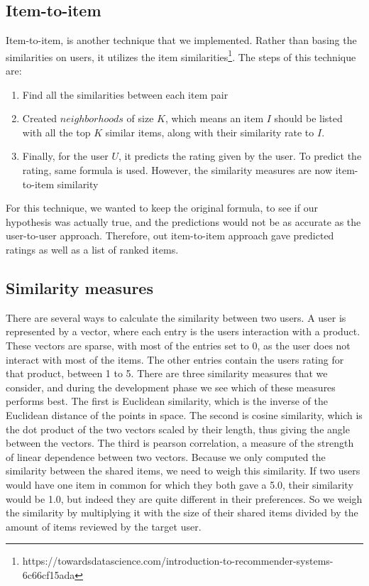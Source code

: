\documentclass[11pt]{article}
\begin{document}
\subsection{Item-to-item}
Item-to-item, is another technique that we implemented. Rather than basing the similarities on users, it utilizes the item similarities\footnote[3]{https://towardsdatascience.com/introduction-to-recommender-systems-6c66cf15ada}. The steps of this technique are:
\begin{enumerate}
	\item Find all the similarities between each item pair
	\item Created $neighborhoods$ of size $K$, which means an item $I$ should be listed with all the top $K$ similar items, along with their similarity rate to $I$.
	\item Finally, for the user $U$, it predicts the rating given by the user. To predict the rating, same formula is used. However, the similarity measures are now item-to-item similarity
\end{enumerate}
For this technique, we wanted to keep the original formula, to see if our hypothesis was actually true, and the predictions would not be as accurate as the user-to-user approach. Therefore, out item-to-item approach gave predicted ratings as well as a list of ranked items.


\subsection{Similarity measures}
There are several ways to calculate the similarity between two users. A user is represented by a vector, where each entry is the users interaction with a product. These vectors are sparse, with most of the entries set to 0, as the user does not interact with most of the items. The other entries contain the users rating for that product, between 1 to 5. There are three similarity measures that we consider, and during the development phase we see which of these measures performs best. The first is Euclidean similarity, which is the inverse of the Euclidean distance of the points in space. The second is cosine similarity, which is the dot product of the two vectors scaled by their length, thus giving the angle between the vectors. The third is pearson correlation, a measure of the strength of linear dependence between two vectors. Because we only computed the similarity between the shared items, we need to weigh this similarity. If two users would have one item in common for which they both gave a 5.0, their similarity would be 1.0, but indeed they are quite different in their preferences. So we weigh the similarity by multiplying it with the size of their shared items divided by the amount of items reviewed by the target user.
\end{document}
